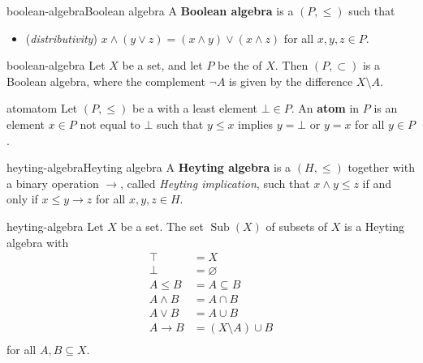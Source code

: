 \begin{topic}{boolean-algebra}{Boolean algebra}
    A \textbf{Boolean algebra} is a  $(P, \le)$ such that
    \begin{itemize}
        \item (\textit{distributivity}) $x \wedge (y \vee z) = (x \wedge y) \vee (x \wedge z)$ for all $x, y, z \in P$.
    \end{itemize}
\end{topic}

\begin{example}{boolean-algebra}
    Let $X$ be a set, and let $P$ be the  of $X$. Then $(P, \subset)$ is a Boolean algebra, where the complement $\neg A$ is given by the difference $X \setminus A$.
\end{example}

\begin{topic}{atom}{atom}
    Let $(P, \le)$ be a  with a least element $\bot \in P$. An \textbf{atom} in $P$ is an element $x \in P$ not equal to $\bot$ such that $y \le x$ implies $y = \bot$ or $y = x$ for all $y \in P$.
\end{topic}

\begin{topic}{heyting-algebra}{Heyting algebra}
    A \textbf{Heyting algebra} is a  $(H, \le)$ together with a binary operation $\rightarrow$, called \textit{Heyting implication}, such that $x \wedge y \le z$ if and only if $x \le y \rightarrow z$ for all $x, y, z \in H$.
\end{topic}

\begin{example}{heyting-algebra}
    Let $X$ be a set. The set $\operatorname{Sub}(X)$ of subsets of $X$ is a Heyting algebra with
    \[ \begin{aligned}
        \top &= X \\
        \bot &= \varnothing \\
        A \le B &= A \subseteq B \\
        A \land B &= A \cap B \\
        A \lor B &= A \cup B \\
        A \to B &= (X \setminus A) \cup B \\
    \end{aligned} \]
    for all $A, B \subseteq X$.
\end{example}

